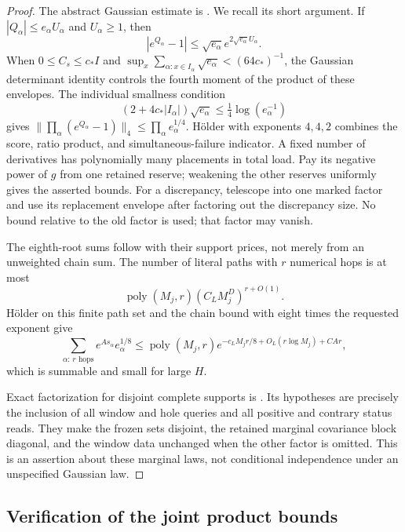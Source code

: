 \begin{proof}
The abstract Gaussian estimate is
\cite[Appendix ``Joint majorants for Gaussian prepared factors'',
Lemma ``A joint Gaussian product estimate'' and Corollary ``Fixed-order
derivatives and an exceptional reserve'']{SharpO4}.  We recall its short
argument.  If $|Q_\alpha|\le e_\alpha U_\alpha$ and $U_\alpha\ge1$, then
\[
 |e^{Q_\alpha}-1|\le\sqrt{e_\alpha}
                  e^{2\sqrt{e_\alpha}U_\alpha}.
\]
When $0\le C_s\le c_*I$ and
$\sup_x\sum_{\alpha:x\in I_\alpha}\sqrt{e_\alpha}
<(64c_*)^{-1}$, the Gaussian determinant identity controls the fourth
moment of the product of these envelopes.  The individual smallness
condition
\[
 (2+4c_*|I_\alpha|)\sqrt{e_\alpha}
                  \le\tfrac14\log(e_\alpha^{-1})
\]
gives $\|\prod_\alpha(e^{Q_\alpha}-1)\|_4
\le\prod_\alpha e_\alpha^{1/4}$.  H\"older with exponents $4,4,2$
combines the score, ratio product, and simultaneous-failure indicator.
A fixed number of derivatives has polynomially many placements in
total load.  Pay its negative power of $g$ from one retained reserve;
weakening the other reserves uniformly gives the asserted bounds.
For a discrepancy, telescope into one marked factor and use its
replacement envelope after factoring out the discrepancy size.  No
bound relative to the old factor is used; that factor may vanish.

The eighth-root sums follow with their support prices, not merely from
an unweighted chain sum.  The number of literal paths with $r$ numerical hops is at most
\[
 \operatorname{poly}(M_j,r)(C_LM_j^D)^{r+O(1)}.
\]
H\"older on this finite path set and the chain bound with eight times
the requested exponent give
\[
 \sum_{\alpha:\,r\text{ hops}}e^{As_\alpha}e_\alpha^{1/8}
 \le\operatorname{poly}(M_j,r)
       e^{-c_LM_jr/8+O_L(r\log M_j)+CAr},
\]
which is summable and small for large $H$.

Exact factorization for disjoint complete supports is
\cite[Appendix ``Local sector factors and their complete supports'',
Lemma ``Local marginals and factorization'']{SharpO4}.  Its hypotheses
are precisely the inclusion of all window and hole queries and all
positive and contrary status reads.  They make the frozen sets disjoint,
the retained marginal covariance block diagonal, and the window data
unchanged when the other factor is omitted.  This is an assertion about
these marginal laws, not conditional independence under an unspecified
Gaussian law.
\end{proof}

\subsection{Verification of the joint product bounds}

